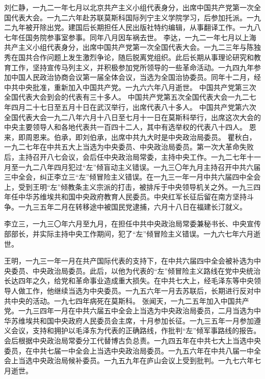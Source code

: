 \begin{maonote}
刘仁静，一九二一年七月以北京共产主义小组代表身分，出席中国共产党第一次全国代表大会。一九二六年赴苏联莫斯科国际列宁主义学院学习，后参加托派。一九二九年被开除出党。建国后长期担任人民出版社特约编辑，从事翻译工作。一九八七年任国务院参事室参事。同年八月因车祸去世。
李达，一九二一年七月以上海共产主义小组代表身分，出席中国共产党第一次全国代表大会。一九二三年与陈独秀在国共合作问题上发生激烈争论，随后脱离党组织。此后长期从事理论研究和教育工作，坚持宣传马列主义，并积极参加党所领导的一些革命活动。一九四九年参加中国人民政治协商会议第一届全体会议，当选为全国治协委员。同年十二月，经中共中央批准，重新加入中国共产党。一九六六年八月逝世。
中国共产党第三次全国代表大会到会的代表有三十多人。
中国共产党第五次全国代表大会一九二七年四月二十七日至五月十日在武汉举行，出席代表八十多人。
中国共产党第六次全国代表大会一九二八年六月十八日至七月十一日在莫斯科举行，出席这次大会的中央主要领导人和各地代表共一百四十二人，其中有选举权的代表八十四人。
恩来，即周恩来。伯承，即刘伯承，出席中共九大时是中央政治局委员。
瞿秋白，一九二七年在中共五大上当选为中央委员、中央政治局委员。第一次大革命失败后，主持召开八七会议，会后任中央政治局常委，主持中央工作。一九二七年十一月至一九二八年四月犯过“左”倾盲动主义错误。一九三〇年九月主持召开中共六届三中全会，纠正李立三“左”倾冒险主义错误。在一九三一年一月中共六届四中全会上，受到王明“左”倾教条主义宗派的打击，被排斥于中央领导机关之外。一九三四年任中华苏维埃共和国中央政府教育人民委员。中央红军长征后留在南方坚持斗争。一九三五年二月在转移途中被国民党逮捕，六月十八日在福建长汀就义。

李立三，一九三〇年六月至九月，在担任中共中央政治局常委兼秘书长、中央宣传部部长，并实际主持中央工作期间，犯了“左”倾冒险主义错误。一九六七年六月逝世。

王明，一九三一年一月在共产国际代表的支持下，在中共六届四中全会被补选为中央委员、中央政治局委员。此后，以他为代表的“左”倾冒险主义路线在党中央统治长达四年之久，给党和革命事业造成重大损失。在中共七大上，经毛泽东等中央领导人做工作，他继续当选为中央委员。一九五六年一月去苏联后，长期进行反对中共中央的活动。一九七四年病死在莫斯科。
张闻天，一九二五年加入中国共产党。一九三四年一月在中共六届五中全会上当选为中央政治局委员，二月当选为中华苏维埃共和国中央政府人民委员会主席，十月参加长征。一九三五年一月参加遵义会议，支持和拥护以毛泽东为代表的正确路线，作批判“左”倾军事路线的报告。会后根据中央政治局常委分工代替博古负总责。一九四五年在中共七大上当选中央委员，在中共七届一中全会上当选中央政治局委员。一九五六年在中共八届一中全会上当选中央政治局候补委员。一九五九年在庐山会议上受到批判。一九七六年七月逝世。


\end{maonote}
